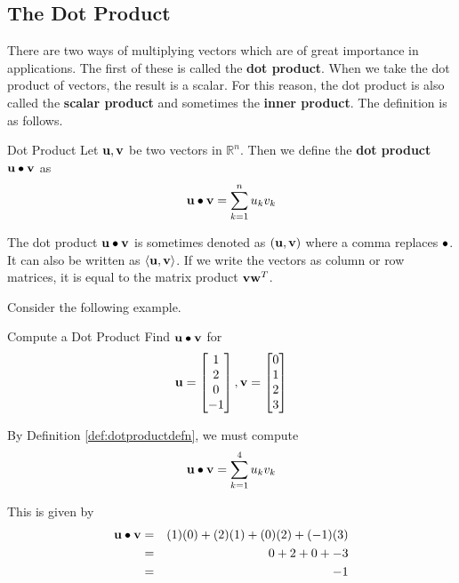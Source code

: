 \subsection{The Dot Product}

There are two ways of multiplying vectors which are of great importance in
applications. The first of these is called the \textbf{dot product}. When we take the dot product of vectors, the 
result is a scalar. For this reason, the dot product is also
called the \textbf{scalar product }and sometimes the \textbf{inner product}. The definition is as follows.

\begin{definition}{Dot Product}\label{def:dotproductdefn}
Let $\mathbf{u},\mathbf{v}$ be two vectors in $\mathbb{R}^{n}$. Then we
define the \textbf{dot product}  $\mathbf{u}\bullet \mathbf{v}$ as
\begin{equation*}
\mathbf{u}\bullet \mathbf{v} = \sum_{k=1}^{n}u_{k}v_{k}
\end{equation*}
\end{definition}

The dot product $\mathbf{u}\bullet \mathbf{v}$ is sometimes denoted as $(\mathbf{u},\mathbf{v})$ where a comma replaces $\bullet $. It can also be written
as $\left\langle \mathbf{u},\mathbf{v}\right\rangle $. If we write the vectors as column or row matrices, it
is equal to the matrix product $\mathbf{v}\mathbf{w}^{T}$.

Consider the following example.

\begin{example}{Compute a Dot Product}\label{exa:dotproduct}
Find $\mathbf{u} \bullet \mathbf{v}$ for
\begin{equation*}
\mathbf{u}
=
\begin{bmatrix}
1 \\
2 \\
0 \\
-1 
\end{bmatrix},
\mathbf{v}
=
\begin{bmatrix}
0 \\
1 \\
2 \\
3
\end{bmatrix}
\end{equation*}
\end{example}

\begin{solution}
By Definition \ref{def:dotproductdefn}, we must compute 
\begin{equation*}
\mathbf{u}\bullet \mathbf{v} = \sum_{k=1}^{4}u_{k}v_{k}
\end{equation*}

This is given by 
\begin{eqnarray*}
\mathbf{u} \bullet \mathbf{v}
&=&
(1)(0) + (2)(1) + (0)(2) + (-1)(3) \\
&=&
0 + 2 + 0 + -3 \\
&=&
-1
\end{eqnarray*}
\end{solution}


